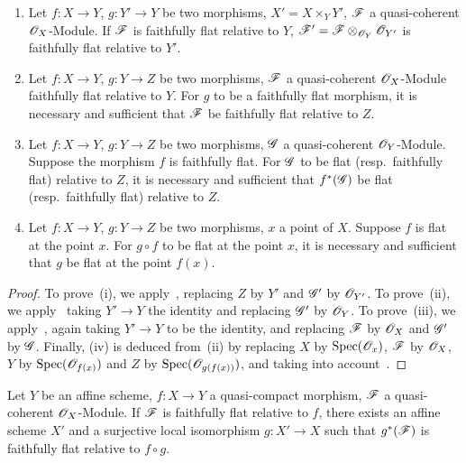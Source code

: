 \begin{corollary}[2.2.11]
\label{IV.2.2.11}
\medskip\noindent
\begin{enumerate}
  \item[\textnormal{(i)}] Let $f:X\to Y$, $g:Y'\to Y$ be two morphisms, $X'=X\times_Y Y'$, $\mathscr{F}$ a quasi-coherent $\mathscr{O}_X$-Module. If $\mathscr{F}$ is faithfully flat relative to $Y$, $\mathscr{F}'=\mathscr{F}\otimes_{\mathscr{O}_Y}\mathscr{O}_{Y'}$ is faithfully flat relative to $Y'$.
  \item[\textnormal{(ii)}] Let $f:X\to Y$, $g:Y\to Z$ be two morphisms, $\mathscr{F}$ a quasi-coherent $\mathscr{O}_X$-Module faithfully flat relative to $Y$.
    For $g$ to be a faithfully flat morphism, it is necessary and sufficient that $\mathscr{F}$ be faithfully flat relative to $Z$.
  \item[\textnormal{(iii)}] Let $f:X\to Y$, $g:Y\to Z$ be two morphisms, $\mathscr{G}$ a quasi-coherent $\mathscr{O}_Y$-Module.
    Suppose the morphism $f$ is faithfully flat.
    For $\mathscr{G}$ to be flat \textnormal{(}resp.\ faithfully flat\textnormal{)} relative to $Z$, it is necessary and sufficient that $f^*(\mathscr{G})$ be flat \textnormal{(}resp.\ faithfully flat\textnormal{)} relative to $Z$.
  \item[\textnormal{(iv)}] Let $f:X\to Y$, $g:Y\to Z$ be two morphisms, $x$ a point of $X$.
    Suppose $f$ is flat at the point $x$. For $g\circ f$ to be flat at the point $x$, it is necessary and sufficient that $g$ be flat at the point $f(x)$.
\end{enumerate}
\end{corollary}

\begin{proof}
To prove~(i), we apply~, replacing $Z$ by $Y'$ and $\mathscr{G}'$ by $\mathscr{O}_{Y'}$.
To prove~(ii), we apply~ taking $Y'\to Y$ the identity and replacing $\mathscr{G}'$ by $\mathscr{O}_Y$.
To prove~(iii), we apply~, again taking $Y'\to Y$ to be the identity, and replacing $\mathscr{F}$ by $\mathscr{O}_X$ and $\mathscr{G}'$ by $\mathscr{G}$.
Finally, (iv) is deduced from~(ii) by replacing $X$ by $\operatorname{Spec}(\mathscr{O}_x)$, $\mathscr{F}$ by $\mathscr{O}_X$, $Y$ by $\operatorname{Spec}(\mathscr{O}_{f(x)})$ and $Z$ by $\operatorname{Spec}(\mathscr{O}_{g(f(x))})$, and taking into account~.
\end{proof}

\begin{corollary}[2.2.12]
\label{IV.2.2.12}
Let $Y$ be an affine scheme, $f:X\to Y$ a quasi-compact morphism,
$\mathscr{F}$ a quasi-coherent $\mathscr{O}_X$-Module.
If $\mathscr{F}$ is faithfully flat relative to $f$, there exists an affine scheme $X'$ and a surjective local isomorphism $g:X'\to X$ such that $g^*(\mathscr{F})$ is faithfully flat relative to $f\circ g$.
\end{corollary}


